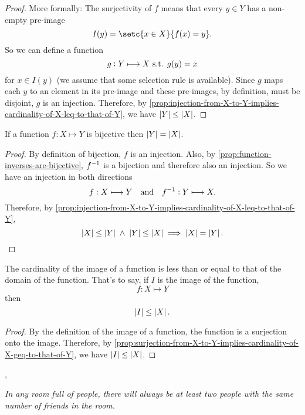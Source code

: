 \documentclass[../MathsNotesBase.tex]{subfiles}
\begin{document}
{\begin{proof}
			More formally: The surjectivity of $f$ means that every ${ y \in Y }$ has a non-empty pre-image
			\[ I(y) = \setc{x \in X}{f(x) = y}. \]
			So we can define a function
			\[ g: Y \longmapsto X \text{ s.t. } g(y) = x \]
			for ${ x \in I(y) }$ (we assume that some selection rule is available). Since $g$ maps each $y$ to an element in its pre-image and these pre-images, by definition, must be disjoint, $g$ is an injection. Therefore, by \autoref{prop:injection-from-X-to-Y-implies-cardinality-of-X-leq-to-that-of-Y}, we have ${ \left\lvert Y\right\rvert \leq \left\lvert X\right\rvert }$.
		\end{proof}
	
		\begin{corollary}\label{coro:bijection-from-X-to-Y-implies-cardinality-of-X-eq-to-that-of-Y}
			If a function ${ f: X \longmapsto Y }$ is bijective then ${ \left\lvert Y\right\rvert = \left\lvert X\right\rvert }$.
		\end{corollary}
		\begin{proof}
			By definition of bijection, $f$ is an injection. Also, by \autoref{prop:function-inverses-are-bijective}, ${f}^{-1}$ is a bijection and therefore also an injection. So we have an injection in both directions
			\[ f: X \longmapsto Y \hspace{10pt}\text{and}\hspace{10pt} {f}^{-1}: Y \longmapsto X. \]
			Therefore, by \autoref{prop:injection-from-X-to-Y-implies-cardinality-of-X-leq-to-that-of-Y},
			\[ \left\lvert X\right\rvert \leq \left\lvert Y\right\rvert \; \land \; \left\lvert Y\right\rvert \leq \left\lvert X\right\rvert \implies \left\lvert X\right\rvert = \left\lvert Y\right\rvert. \]
		\end{proof}
	
		\begin{corollary}
			The cardinality of the image of a function is less than or equal to that of the domain of the function. That's to say, if $I$ is the image of the function,
			\[ f: X \longmapsto Y \]
			then 
			\[ \left\lvert I\right\rvert \leq \left\lvert X\right\rvert. \]
		\end{corollary}
		\begin{proof}
			By the definition of the image of a function, the function is a surjection onto the image. Therefore, by \autoref{prop:surjection-from-X-to-Y-implies-cardinality-of-X-geq-to-that-of-Y}, we have ${ \left\lvert I\right\rvert \leq \left\lvert X\right\rvert }$.
		\end{proof}
		
		
		
		\sep
		\begin{exe}
			\ex \textit{In any room full of people, there will always be at least two people with the same number of friends in the room.}\\
			

\end{exe}}
\end{document}
